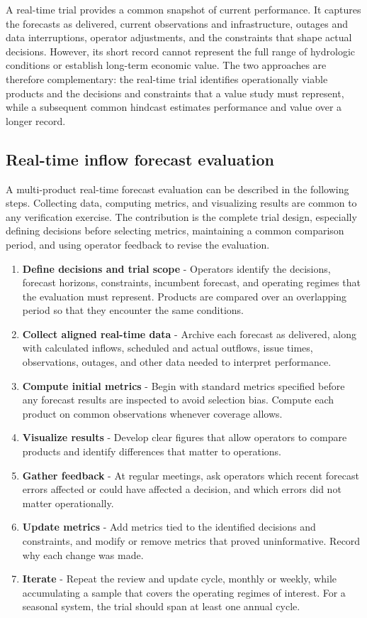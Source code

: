 \documentclass[MLA]{USG} %
\begin{document}
A real-time trial provides a common snapshot of current performance. It captures the forecasts as delivered, current observations and infrastructure, outages and data interruptions, operator adjustments, and the constraints that shape actual decisions. However, its short record cannot represent the full range of hydrologic conditions or establish long-term economic value. The two approaches are therefore complementary: the real-time trial identifies operationally viable products and the decisions and constraints that a value study must represent, while a subsequent common hindcast estimates performance and value over a longer record.

\subsection{Real-time inflow forecast evaluation}\label{sec:realtime}
A multi-product real-time forecast evaluation can be described in the following steps. Collecting data, computing metrics, and visualizing results are common to any verification exercise. The contribution is the complete trial design, especially defining decisions before selecting metrics, maintaining a common comparison period, and using operator feedback to revise the evaluation.
\begin{enumerate}
    \item \textbf{Define decisions and trial scope} - Operators identify the decisions, forecast horizons, constraints, incumbent forecast, and operating regimes that the evaluation must represent. Products are compared over an overlapping period so that they encounter the same conditions.
    \item \textbf{Collect aligned real-time data} - Archive each forecast as delivered, along with calculated inflows, scheduled and actual outflows, issue times, observations, outages, and other data needed to interpret performance.
    \item \textbf{Compute initial metrics} - Begin with standard metrics specified before any forecast results are inspected to avoid selection bias. Compute each product on common observations whenever coverage allows.
    \item \textbf{Visualize results} - Develop clear figures that allow operators to compare products and identify differences that matter to operations.
    \item \textbf{Gather feedback} - At regular meetings, ask operators which recent forecast errors affected or could have affected a decision, and which errors did not matter operationally.
    \item \textbf{Update metrics} - Add metrics tied to the identified decisions and constraints, and modify or remove metrics that proved uninformative. Record why each change was made.
    \item \textbf{Iterate} - Repeat the review and update cycle, monthly or weekly, while accumulating a sample that covers the operating regimes of interest. For a seasonal system, the trial should span at least one annual cycle.
\end{enumerate}
\end{document}
